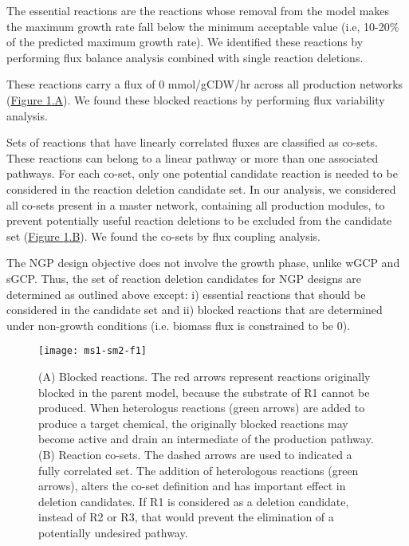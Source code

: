 	 The essential reactions are the reactions whose removal from the model makes the maximum growth rate fall below the minimum acceptable value (i.e, 10-20\% of the predicted maximum growth rate). We identified these reactions by performing flux balance analysis combined with single reaction deletions.

	 These reactions carry a flux of 0 mmol/gCDW/hr across all production networks  (\hyperref[fig:candidaterxn]{Figure \ref{fig:candidaterxn}.A}).  We found these blocked reactions by performing flux variability analysis.

	 Sets of reactions that have linearly correlated fluxes are classified as co-sets. These reactions can belong to a linear pathway or more than one associated pathways. For each co-set, only one potential candidate reaction is needed to be considered in the reaction deletion candidate set. In our analysis, we considered all co-sets present in a master network, containing all production modules, to prevent potentially useful reaction deletions to be excluded from the candidate set (\hyperref[fig:candidaterxn]{Figure \ref{fig:candidaterxn}.B}). We found the co-sets by flux coupling analysis.

	 The NGP design objective does not involve the growth phase, unlike wGCP and sGCP. Thus, the set of reaction deletion candidates for NGP designs are determined as outlined above except: i) essential reactions that should be considered in the candidate set and ii) blocked reactions that are determined under non-growth conditions (i.e. biomass flux is constrained to be 0).

\begin{figure}[ht]
    \texttt{[image: ms1-sm2-f1]}
    \caption[Blocked and co-set reactions in deletion candidate determination]{(A) Blocked reactions. The red arrows represent reactions originally blocked in the parent model, because the substrate of R1 cannot be produced. When heterologus reactions (green arrows) are added to produce a target chemical, the originally blocked reactions may become active and drain an intermediate of the production pathway. (B) Reaction co-sets. The dashed arrows are used to indicated a fully correlated set. The addition of heterologous reactions (green arrows), alters the co-set definition and has important effect in deletion candidates. If R1 is considered as a deletion candidate, instead of R2 or R3, that would prevent the elimination of a potentially undesired pathway.}
\label{fig:candidaterxn}
\end{figure}
